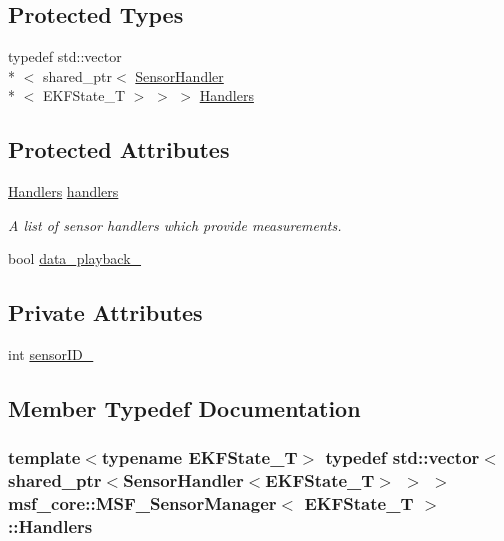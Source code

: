 \subsection*{Protected Types}
\begin{DoxyCompactItemize}
\item 
typedef std\-::vector\\*
$<$ shared\-\_\-ptr$<$ \hyperlink{classmsf__core_1_1SensorHandler}{Sensor\-Handler}\\*
$<$ E\-K\-F\-State\-\_\-\-T $>$ $>$ $>$ \hyperlink{classmsf__core_1_1MSF__SensorManager_a4bcde5443748c5580b583f2056d4dc67}{Handlers}
\end{DoxyCompactItemize}
\subsection*{Protected Attributes}
\begin{DoxyCompactItemize}
\item 
\hyperlink{classmsf__core_1_1MSF__SensorManager_a4bcde5443748c5580b583f2056d4dc67}{Handlers} \hyperlink{classmsf__core_1_1MSF__SensorManager_a7c6fe8b491f541562cbf863c452891fd}{handlers}
\begin{DoxyCompactList}\small\item\em A list of sensor handlers which provide measurements. \end{DoxyCompactList}\item 
bool \hyperlink{classmsf__core_1_1MSF__SensorManager_a49ac85275688e5588b73ed98795abe1a}{data\-\_\-playback\-\_\-}
\end{DoxyCompactItemize}
\subsection*{Private Attributes}
\begin{DoxyCompactItemize}
\item 
int \hyperlink{classmsf__core_1_1MSF__SensorManager_aacf4e41e98ee0b2cc366cdd725a7ae69}{sensor\-I\-D\-\_\-}
\end{DoxyCompactItemize}


\subsection{Member Typedef Documentation}
\hypertarget{classmsf__core_1_1MSF__SensorManager_a4bcde5443748c5580b583f2056d4dc67}{
\subsubsection[{Handlers}]{\setlength{\rightskip}{0pt plus 5cm}template$<$typename E\-K\-F\-State\-\_\-\-T$>$ typedef std\-::vector$<$shared\-\_\-ptr$<${\bf Sensor\-Handler}$<$E\-K\-F\-State\-\_\-\-T$>$ $>$ $>$ {\bf msf\-\_\-core\-::\-M\-S\-F\-\_\-\-Sensor\-Manager}$<$ E\-K\-F\-State\-\_\-\-T $>$\-::{\bf Handlers}\hspace{0.3cm}{\ttfamily [protected]}}}\label{classmsf__core_1_1MSF__SensorManager_a4bcde5443748c5580b583f2056d4dc67}


